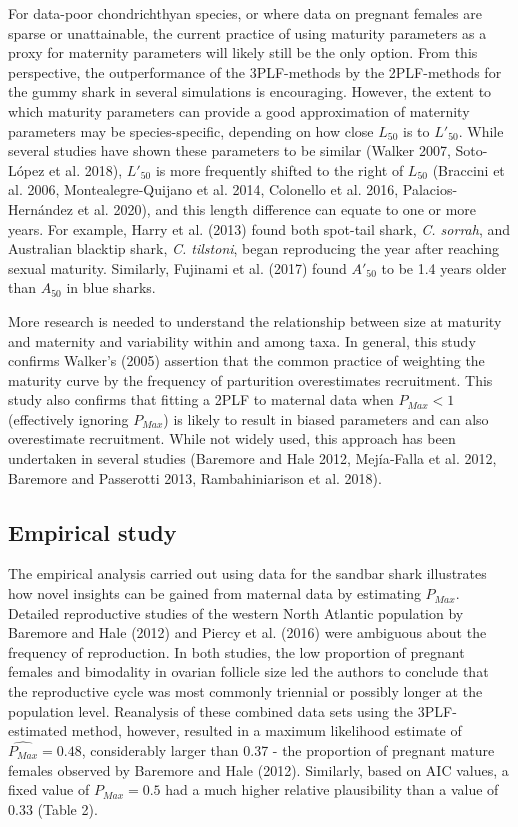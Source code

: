 \documentclass[
]{article}
\begin{document}
For data-poor chondrichthyan species, or where data on pregnant females are sparse or unattainable, the current practice of using maturity parameters as a proxy for maternity parameters will likely still be the only option. From this perspective, the outperformance of the 3PLF-methods by the 2PLF-methods for the gummy shark in several simulations is encouraging. However, the extent to which maturity parameters can provide a good approximation of maternity parameters may be species-specific, depending on how close \(L_{50}\) is to \(L'_{50}\). While several studies have shown these parameters to be similar (Walker 2007, Soto-López et al. 2018), \(L'_{50}\) is more frequently shifted to the right of \(L_{50}\) (Braccini et al. 2006, Montealegre-Quijano et al. 2014, Colonello et al. 2016, Palacios-Hernández et al. 2020), and this length difference can equate to one or more years. For example, Harry et al. (2013) found both spot-tail shark, \emph{C. sorrah}, and Australian blacktip shark, \emph{C. tilstoni}, began reproducing the year after reaching sexual maturity. Similarly, Fujinami et al. (2017) found \(A'_{50}\) to be 1.4 years older than \(A_{50}\) in blue sharks.

More research is needed to understand the relationship between size at maturity and maternity and variability within and among taxa. In general, this study confirms Walker's (2005) assertion that the common practice of weighting the maturity curve by the frequency of parturition overestimates recruitment. This study also confirms that fitting a 2PLF to maternal data when \(P_{Max} < 1\) (effectively ignoring \(P_{Max}\)) is likely to result in biased parameters and can also overestimate recruitment. While not widely used, this approach has been undertaken in several studies (Baremore and Hale 2012, Mejía‐Falla et al. 2012, Baremore and Passerotti 2013, Rambahiniarison et al. 2018).

\subsection{Empirical study}\label{empirical-study}

The empirical analysis carried out using data for the sandbar shark illustrates how novel insights can be gained from maternal data by estimating \(P_{Max}\). Detailed reproductive studies of the western North Atlantic population by Baremore and Hale (2012) and Piercy et al. (2016) were ambiguous about the frequency of reproduction. In both studies, the low proportion of pregnant females and bimodality in ovarian follicle size led the authors to conclude that the reproductive cycle was most commonly triennial or possibly longer at the population level. Reanalysis of these combined data sets using the 3PLF-estimated method, however, resulted in a maximum likelihood estimate of \(\hat{P_{Max}} = 0.48\), considerably larger than 0.37 - the proportion of pregnant mature females observed by Baremore and Hale (2012). Similarly, based on AIC values, a fixed value of \(P_{Max} = 0.5\) had a much higher relative plausibility than a value of 0.33 (Table 2).
\end{document}
